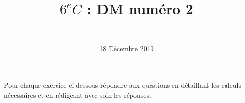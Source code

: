 \documentclass[a4paper,11pt]{exam}
\author{\ }
\date{18 Décembre 2019}
\title{$6^e C$ : DM num\'ero 2}
\makeatletter
\def\maketitle{{\centering%
		\par{\huge\textbf{\@title}}%
		\par{\@date}%
		\par}}
\makeatother
\begin{document}
%	

	\maketitle
%	


	
Pour chaque exercice ci-dessous répondre aux questions en  détaillant les calculs nécessaires et en rédigeant avec soin les réponses.
	








\label{LastPage}

%
\end{document}
